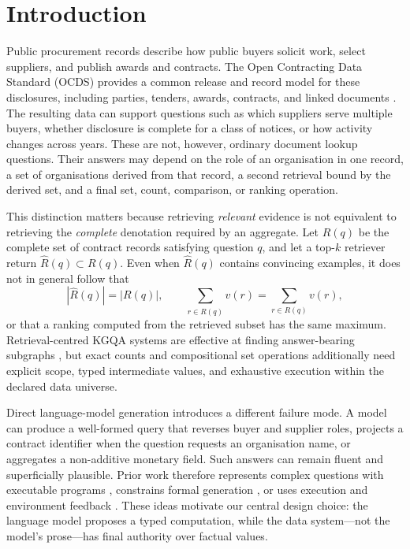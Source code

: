 \section{Introduction}
\label{sec:introduction}

Public procurement records describe how public buyers solicit work, select suppliers, and
publish awards and contracts.  The Open Contracting Data Standard (OCDS) provides a common
release and record model for these disclosures, including parties, tenders, awards, contracts,
and linked documents \citep{ocds-standard}.  The resulting data can support questions such as
which suppliers serve multiple buyers, whether disclosure is complete for a class of notices,
or how activity changes across years.  These are not, however, ordinary document lookup
questions.  Their answers may depend on the role of an organisation in one record, a set of
organisations derived from that record, a second retrieval bound by the derived set, and a final
set, count, comparison, or ranking operation.

This distinction matters because retrieving \emph{relevant} evidence is not equivalent to
retrieving the \emph{complete} denotation required by an aggregate.  Let $R(q)$ be the complete
set of contract records satisfying question $q$, and let a top-$k$ retriever return
$\widehat{R}(q)\subset R(q)$.  Even when $\widehat{R}(q)$ contains convincing examples, it does
not in general follow that
\begin{equation}
 |\widehat{R}(q)|=|R(q)|, \qquad
 \sum_{r\in\widehat{R}(q)}v(r)=\sum_{r\in R(q)}v(r),
 \label{eq:retrieval-not-aggregation}
\end{equation}
or that a ranking computed from the retrieved subset has the same maximum.  Retrieval-centred
KGQA systems are effective at finding answer-bearing subgraphs \citep{sun-etal-2019-pullnet,
jiang2023unikgqa,luo2024rog}, but exact counts and compositional set operations additionally
need explicit scope, typed intermediate values, and exhaustive execution within the declared
data universe.

Direct language-model generation introduces a different failure mode.  A model can produce a
well-formed query that reverses buyer and supplier roles, projects a contract identifier when
the question requests an organisation name, or aggregates a non-additive monetary field.  Such
answers can remain fluent and superficially plausible.  Prior work therefore represents complex
questions with executable programs \citep{cao-etal-2022-kqa,wolfson-etal-2020-break}, constrains
formal generation \citep{scholak-etal-2021-picard,shu-etal-2022-tiara}, or uses execution and
environment feedback \citep{chen-etal-2021-retrack,huang-etal-2024-queryagent}.  These ideas
motivate our central design choice: the language model proposes a typed computation, while the
data system---not the model's prose---has final authority over factual values.

